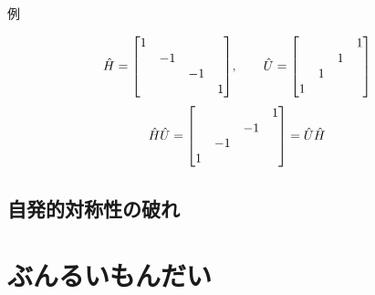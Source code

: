 \documentclass[dvipdfm]{beamer}
\begin{document}
\begin{frame}{例}
    \begin{example}
        \begin{equation*}
            \hat{H}=\mqty[\dmat{1,-1,-1,1}],
            \qquad
            \hat{U}=\mqty[ & & & 1 \\ & & 1 & \\ & 1 & & \\ 1 & & & ]
        \end{equation*}
        \begin{equation*}
            \hat{H}\hat{U}
            =
            \mqty[ & & & 1 \\ & & -1 & \\ & -1 & & \\ 1 & & & ]
            =
            \hat{U}\hat{H}
        \end{equation*}
    \end{example}
\end{frame}

\subsection{自発的対称性の破れ}



\section{ぶんるいもんだい}
\end{document}
